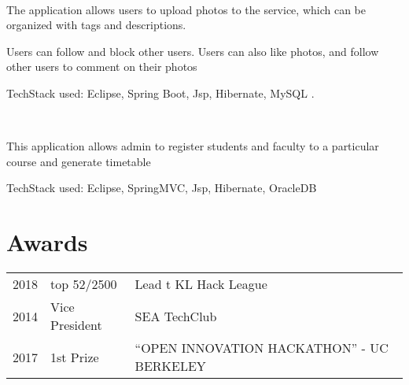 \documentclass[]{deedy-resume-openfont}
\begin{document}
\begin{minipage}[t]{0.66\textwidth}
\\
\begin{tightemize}
\item The application allows users to upload photos to the service, which can be organized with tags and descriptions.
\item Users can follow and block other users. Users can also like photos, and follow other users to comment on their photos
\item TechStack used: Eclipse, Spring Boot, Jsp, Hibernate, MySQL .
\end{tightemize}
\sectionsep

\\
\begin{tightemize}
\item This application allows admin to register students and faculty to a particular course and generate timetable
\item TechStack used:  Eclipse, SpringMVC, Jsp, Hibernate, OracleDB
\end{tightemize}
\sectionsep


\section{Awards} 
\begin{tabular}{rll}
2018	     & top 52/2500  & Lead t KL Hack League\\
2014	     & Vice President  & SEA TechClub\\
2017     & 1st Prize & “OPEN INNOVATION HACKATHON” - UC BERKELEY\\
\end{tabular}
\sectionsep

\nocite{*}

\end{minipage} 
\end{document}
